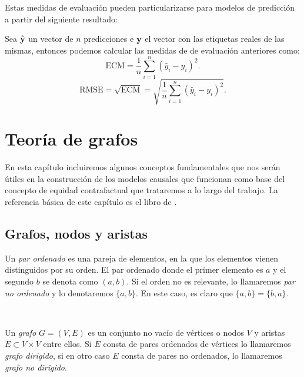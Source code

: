 \documentclass[oneside,openright,titlepage,numbers=noenddot,openany,headinclude,footinclude=true,
cleardoublepage=empty,abstractoff,BCOR=5mm,paper=a4,fontsize=12pt,main=spanish]{scrreprt}
\begin{document}
Estas medidas de evaluación pueden particularizarse para modelos de predicción a partir del siguiente resultado:\\

\begin{proposition}
Sea $\hat{\textbf{y}}$ un vector de $n$ predicciones e $\textbf{y}$ el vector con las etiquetas reales de las mismas, entonces podemos calcular las medidas de de evaluación anteriores como: $$\text{ECM}=\frac{1}{n}\sum_{i=1}^n (\hat{y}_i-y_i)^2.$$ $$\text{RMSE}=\sqrt{\text{ECM}}=\sqrt{\frac{1}{n}\sum_{i=1}^n (\hat{y}_i-y_i)^2}.$$
\end{proposition}

\chapter{Teoría de grafos}

En esta capítulo incluiremos algunos conceptos fundamentales que nos serán útiles en la construcción de los modelos causales que funcionan como base del concepto de equidad contrafactual que trataremos a lo largo del trabajo. La referencia básica de este capítulo es el libro de \cite{graphtheory2001}.

\section{Grafos, nodos y aristas}

\begin{definition}
Un \textit{par ordenado} es una pareja de elementos, en la que los elementos vienen distinguidos por su orden. El par ordenado donde el primer elemento es $a$ y el segundo $b$ se denota como $(a,b)$. Si el orden no es relevante, lo llamaremos \textit{par no ordenado} y lo denotaremos $\{a,b\}$. En este caso, es claro que $\{a,b\}=\{b,a\}$.
\end{definition}\

\begin{definition}[Grafo]
Un \textit{grafo} $G = (V,E)$ es un conjunto no vacío de vértices o nodos $V$ y aristas $E \subset V\times V$ entre ellos.
Si $E$ consta de pares ordenados de vértices lo llamaremos \textit{grafo dirigido}, si en otro caso $E$ consta de pares no ordenados, lo llamaremos \textit{grafo no dirigido}.
\end{definition}\
\end{document}
